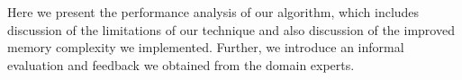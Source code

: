 Here we present the performance analysis of our algorithm, which includes discussion of the limitations of our technique and also discussion of the improved memory complexity we implemented. Further, we introduce an informal evaluation and feedback we obtained from the domain experts. 
%




